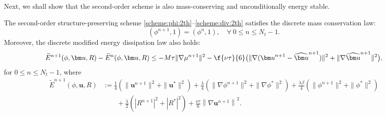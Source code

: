 Next, we shall show that the second-order  scheme is also mass-conserving and unconditionally energy stable. 
\begin{theorem} \label{thm:energy:2th}
	The second-order  structure-preserving  scheme \eqref{scheme:phi:2th}--\eqref{scheme:div:2th}  satisfies the discrete mass conservation law:
	\begin{equation*}
		(\phi^{n+1},1)=(\phi^n,1), \quad \forall~  0 \le n \le N_t-1.
	\end{equation*}
	Moreover,   the discrete modified energy dissipation law also holds: 
	\begin{equation*}
		\widetilde{E}^{n+1}(\phi,  \bm u, R) - \widetilde{E}^{n}(\phi,  \bm u, R) \leq -M\tau \|\nabla \mu^{n+1}\|^2 -\f{\nu \tau}{6} \big(\|\nabla({\bm u}^{n+1}- \widehat{\bm u}^{n+1})\|^2 + \|\nabla \widehat{\bm u}^{n+1}\|^2\big),
	\end{equation*}
	for $0 \le n \le N_t-1$, where
	\begin{equation}\label{energy:mod:2th}
		\begin{aligned}
			\widetilde{E}^{n+1}(\phi,  \bm u, R) 
			& := \frac{1}{4}\left(\|\bm u^{n+1}\|^2+\|\bm u^{*}\|^2 \right)
			+\frac{\lambda}{4}\left(\|\nabla \phi^{n+1}\|^2+\|\nabla \phi^{*}\|^2 \right)
			+\frac{\lambda\beta}{4} \left(\|\phi^{n+1}\|^2+ \|\phi^{*}\|^2 \right)  \\
			&\qquad   + \frac{\lambda}{2}\left( |R^{n+1}|^2   +  |R^{*}|^2 \right)
			+  \frac{\nu \tau}{6} \left\|\nabla \bm u^{n+1}\right\|^2.
		\end{aligned}
	\end{equation}
\end{theorem}
